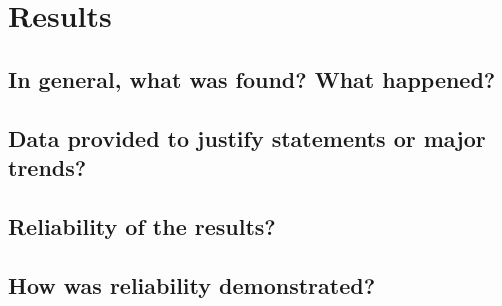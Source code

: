 \documentclass[12pt,oneside,letterpaper,titlepage]{article}
\begin{document}
\section{Results}

\subsection{In general, what was found? What happened?}

\subsection{Data provided to justify statements or major trends?}

\subsection{Reliability of the results?}

\subsection{How was reliability demonstrated?}
\end{document}

